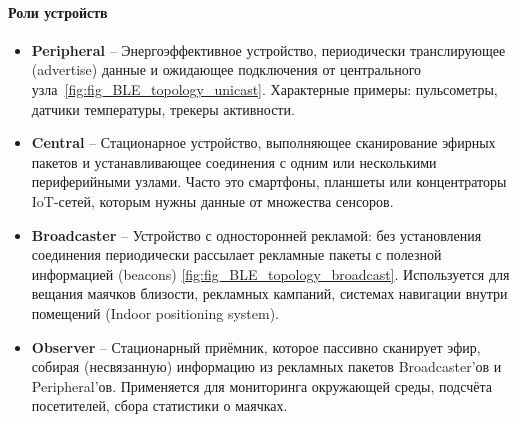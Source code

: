 \documentclass[14pt,a4paper]{extarticle}
\begin{document}
\paragraph{Роли устройств}
\begin{itemize}
  \item \textbf{Peripheral} -- Энергоэффективное устройство, периодически транслирующее (advertise) данные и ожидающее подключения от центрального узла~\ref{fig:fig_BLE_topology_unicast}. Характерные примеры: пульсометры, датчики температуры, трекеры активности.
  \item \textbf{Central} -- Стационарное устройство, выполняющее сканирование эфирных пакетов и устанавливающее соединения с одним или несколькими периферийными узлами. Часто это смартфоны, планшеты или концентраторы IoT-сетей, которым нужны данные от множества сенсоров.
  \item \textbf{Broadcaster} -- Устройство с односторонней рекламой: без установления соединения периодически рассылает рекламные пакеты с полезной информацией (beacons) \ref{fig:fig_BLE_topology_broadcast}. Используется для вещания маячков близости, рекламных кампаний, системах навигации внутри помещений (Indoor positioning system).
  \item \textbf{Observer} -- Стационарный приёмник, которое пассивно сканирует эфир, собирая (несвязанную) информацию из рекламных пакетов Broadcaster’ов и Peripheral’ов. Применяется для мониторинга окружающей среды, подсчёта посетителей, сбора статистики о маячках.
\end{itemize}
\end{document}
